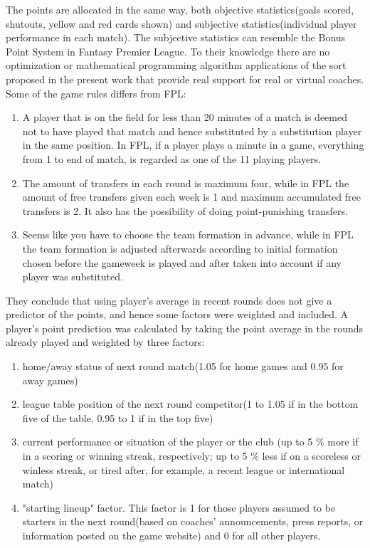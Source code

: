 The points are allocated in the same way, both objective statistics(goals scored, shutouts, yellow and red cards shown) and subjective statistics(individual player performance in each match). The subjective statistics can resemble the Bonus Point System in Fantasy Premier League. To their knowledge there are no optimization or mathematical programming algorithm applications of the sort proposed in the present work that provide real support for real or virtual coaches. Some of the game rules differs from FPL: 
\begin{enumerate}
    \item A player that is on the field for less than 20 minutes of a match is deemed not to have played that match and hence substituted by a substitution player in the same position. In FPL, if a player plays a minute in a game, everything from 1 to end of match, is regarded as one of the 11 playing players. 
    \item The amount of transfers in each round is maximum four, while in FPL the amount of free transfers given each week is 1 and maximum accumulated free transfers is 2. It also has the possibility of doing point-punishing transfers. 
    \item Seems like you have to choose the team formation in advance, while in FPL the team formation is adjusted afterwards according to initial formation chosen before the gameweek is played and after taken into account if any player was substituted. 
\end{enumerate}

They conclude that using player's average in recent rounds does not give a predictor of the points, and hence some factors were weighted and included. A player's point prediction was calculated by taking the point average in the rounds already played and weighted by three factors: 
\begin{enumerate}
    \item home/away status of next round match(1.05 for home games and 0.95 for away games) 
    \item league table position of the next round competitor(1 to 1.05 if in the bottom five of the table, 0.95 to 1 if in the top five)
    \item current performance or situation of the player or the club (up to 5 \% more if in a scoring or winning streak, respectively; up to 5 \% less if on a scoreless or winless streak, or tired after, for example, a recent league or international match)
    \item "starting lineup" factor. This factor is 1 for those players assumed to be starters in the next round(based on coaches' announcements, press reports, or information posted on the game website) and 0 for all other players. 
\end{enumerate}

